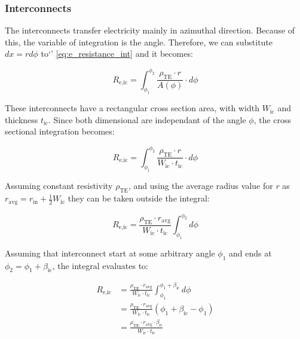 \documentclass[10pt,a4paper,twocolumn]{article}
\begin{document}
\subsubsection{Interconnects}

The interconnects transfer electricity mainly in azimuthal direction. Because of this, the variable of integration is the angle. Therefore, we can substitute $dx=rd\phi$ to`' \cref{eq:e_resistance_int} and it becomes:

\begin{equation}
  R_{\text{e,ic}} = \int_{\phi_1}^{\phi_2} \frac{\rho_{\text{TE}}\cdot r}{A(\phi)}\cdot d\phi
\end{equation}


These interconnects have a rectangular cross section area, with width $W_{\text{ic}}$ and thickness $t_{\text{ic}}$. Since both dimensional are independant of the angle $\phi$, the cross sectional integration becomes:

\begin{equation*}
  R_{\text{e,ic}} = \int_{\phi_1}^{\phi_2} \frac{\rho_{\text{TE}}\cdot r}{W_{\text{ic}} \cdot t_{\text{ic}}} \cdot d\phi
\end{equation*}

Assuming constant resistivity $\rho_{\text{TE}}$, and using the average radius value for $r$ as $r_{\text{avg}}=r_{\text{in}}+\frac{1}{2}W_{\text{ic}}$ they can be taken outside the integral:

\begin{equation*}
  R_{\text{e,ic}} = \frac{\rho_{\text{TE}}\cdot r_{\text{avg}}}{W_{\text{ic}} \cdot t_{\text{ic}}} \int_{\phi_1}^{\phi_2} d\phi
\end{equation*}

Assuming that interconnect start at some arbitrary angle $\phi_1$ and ends at $\phi_2 = \phi_1 + \beta_{\text{ic}}$, the integral evaluates to:

\begin{equation*}
  \begin{aligned}
    R_{\text{e,ic}} & =  \frac{\rho_{\text{TE}}\cdot r_{\text{avg}}}{W_{\text{ic}} \cdot t_{\text{ic}}}  \int_{\phi_1}^{\phi_1 + \beta_{\text{ic}}}d\phi \\
                    & = \frac{\rho_{\text{TE}} \cdot r_{\text{avg}} }{W_{\text{ic}} \cdot t_{\text{ic}}}(\phi_1 + \beta_{\text{ic}} - \phi_1)            \\
                    & = \frac{\rho_{\text{TE}} \cdot r_{\text{avg}} \cdot \beta_{\text{ic}}}{W_{\text{ic}} \cdot t_{\text{ic}}}
  \end{aligned}
\end{equation*}
\end{document}
